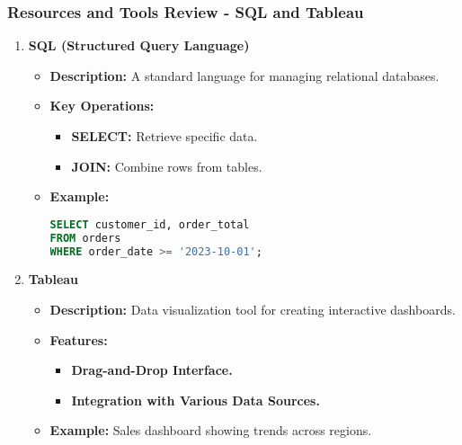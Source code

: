 \documentclass{beamer}
\begin{document}
\begin{frame}[fragile]
    \frametitle{Resources and Tools Review - SQL and Tableau}
    \begin{enumerate}[resume]
        \item \textbf{SQL (Structured Query Language)}
        \begin{itemize}
            \item \textbf{Description:} A standard language for managing relational databases.
            \item \textbf{Key Operations:}
            \begin{itemize}
                \item \textbf{SELECT:} Retrieve specific data.
                \item \textbf{JOIN:} Combine rows from tables.
            \end{itemize}
            \item \textbf{Example:} 
            \begin{lstlisting}[language=SQL]
SELECT customer_id, order_total 
FROM orders 
WHERE order_date >= '2023-10-01';
            \end{lstlisting}
        \end{itemize}

        \item \textbf{Tableau}
        \begin{itemize}
            \item \textbf{Description:} Data visualization tool for creating interactive dashboards.
            \item \textbf{Features:}
            \begin{itemize}
                \item \textbf{Drag-and-Drop Interface.}
                \item \textbf{Integration with Various Data Sources.}
            \end{itemize}
            \item \textbf{Example:} Sales dashboard showing trends across regions.
        \end{itemize}
    \end{enumerate}
\end{frame}
\end{document}
